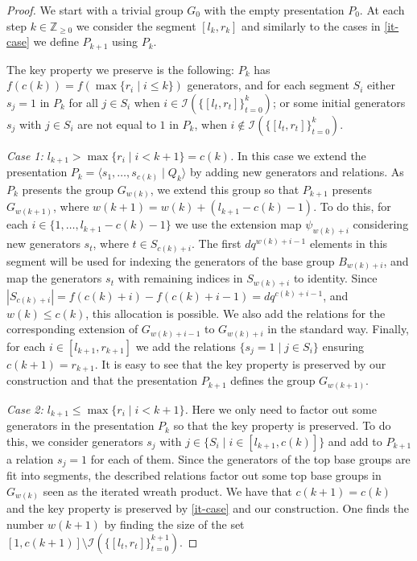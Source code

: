 \documentclass[10pt,a4paper]{amsart}
\begin{document}
\begin{proof}

\smallskip

We start with a trivial group $G_0$ with the empty presentation $P_0$. At each step $k\in \mathbb Z_{\geq 0}$ we consider the segment $[l_k,r_k]$ and similarly to the cases in \eqref{it-case} we define $P_{k+1}$ using $P_k$. 

The key property we preserve is the following: $P_k$ has $f(c(k))=f(\max \{r_i \mid i\leq k\})$ generators, and for each segment $S_i$ either $s_j=1$ in $P_k$ for all $j\in S_i$ when $i\in \mathcal I(\{[l_t,r_t]\}_{t=0}^k)$; or some initial generators $s_j$ with $j\in S_i$ are not equal to $1$ in $P_k$, when $i\notin \mathcal I(\{[l_t,r_t]\}_{t=0}^k)$. 

\emph{Case 1: $l_{k+1}>\max \{r_i \mid i<k+1\}=c(k)$.} In this case we extend the presentation $P_k=\langle s_1,\ldots,s_{c(k)} \mid Q_k \rangle$ by adding new generators and relations. As $P_k$ presents the group $G_{w(k)}$, we extend this group so that $P_{k+1}$ presents $G_{w(k+1)}$, where $w(k+1)=w(k)+(l_{k+1}-c(k)-1)$. To do this, for each $i\in \{1,\ldots,l_{k+1}-c(k)-1\}$ we use the extension map $\psi_{w(k)+i}$ considering new generators $s_t$, where $t\in S_{c(k)+i}$. The first $dq^{w(k)+i-1}$ elements in this segment will be used for indexing the generators of the base group $B_{w(k)+i}$, and map the generators $s_t$ with remaining indices in $S_{w(k)+i}$ to identity. Since $|S_{c(k)+i}|=f(c(k)+i)-f(c(k)+i-1)=dq^{c(k)+i-1}$, and $w(k)\leq c(k)$, this allocation is possible. We also add the relations for the corresponding extension of $G_{w(k)+i-1}$ to $G_{w(k)+i}$ in the standard way. Finally, for each $i\in [l_{k+1},r_{k+1}]$ we add the relations $\{ s_j=1 \mid j \in  S_{i} \}$ ensuring  $c(k+1)=r_{k+1}$. It is easy to see that the key property is preserved by our construction and that the presentation $P_{k+1}$ defines the group $G_{w(k+1)}$.

\emph{Case 2: $l_{k+1}\leq\max \{r_i \mid i<k+1\}$.} Here we only need to factor out some generators in the presentation $P_k$ so that the key property is preserved. To do this, we consider generators $s_j$ with $j\in \{S_i \mid i\in [l_{k+1},c(k)]\}$ and add to $P_{k+1}$ a relation $s_j=1$ for each of them. Since the generators of the top base groups are fit into segments, the described relations factor out some top base groups in $G_{w(k)}$ seen as the iterated wreath product. We have that $c(k+1)=c(k)$ and the key property is preserved by \eqref{it-case} and our construction. One finds the number $w(k+1)$ by finding the size of the set $[1,c(k+1)]\setminus \mathcal I(\{[l_t,r_t]\}_{t=0}^{k+1})$.


\end{proof}
\end{document}
